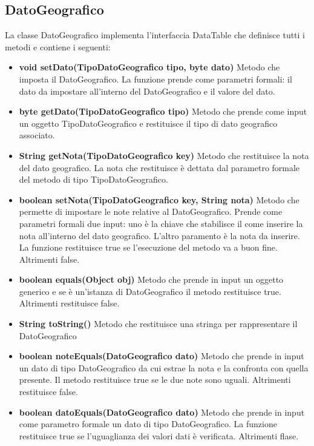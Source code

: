 \documentclass[a4paper, 12pt]{report}
\begin{document}
			\subsection{DatoGeografico}
			La classe DatoGeografico implementa l'interfaccia DataTable che definisce tutti i metodi e contiene i seguenti:
			\begin{itemize}
			\item \textbf{void setDato(TipoDatoGeografico tipo, byte dato)}
			Metodo che imposta il DatoGeografico. La funzione prende come parametri formali: il dato da impostare all'interno del DatoGeografico e il valore del dato.
			\item \textbf{byte getDato(TipoDatoGeografico tipo)}
			Metodo che prende come input un oggetto TipoDatoGeografico e restituisce il tipo di dato geografico associato.
			\item \textbf{String getNota(TipoDatoGeografico key)}
			Metodo che restituisce la nota del dato geografico. La nota che restituisce è dettata dal parametro formale del metodo di tipo TipoDatoGeografico.
			\item \textbf{boolean setNota(TipoDatoGeografico key, String nota)}
			Metodo che permette di impostare le note relative al DatoGeografico. Prende come parametri formali due input: uno è la chiave che stabilisce il come inserire la nota all'interno del dato geografico. L'altro paramento è la nota da inserire.
			La funzione restituisce true se l'esecuzione del metodo va a buon fine. Altrimenti false.
			\item \textbf{boolean equals(Object obj)}
			Metodo che prende in input un oggetto generico e se è un'istanza di DatoGeografico il metodo restituisce true. Altrimenti restituisce false.
			\item \textbf{String toString()}
			Metodo che restituisce una stringa per rappresentare il DatoGeografico
			\item \textbf{boolean noteEquals(DatoGeografico dato)}
			Metodo che prende in input un dato di tipo DatoGeografico da cui estrae la nota e la confronta con quella presente. Il metodo restituisce true se le due note sono uguali. Altrimenti restituisce false.
			\item \textbf{boolean datoEquals(DatoGeografico dato)}
			Metodo che prende in input come parametro formale un dato di tipo DatoGeografico. La funzione restituisce true se l'uguaglianza dei valori dati è verificata. Altrimenti flase.
			\end{itemize}
\end{document}
